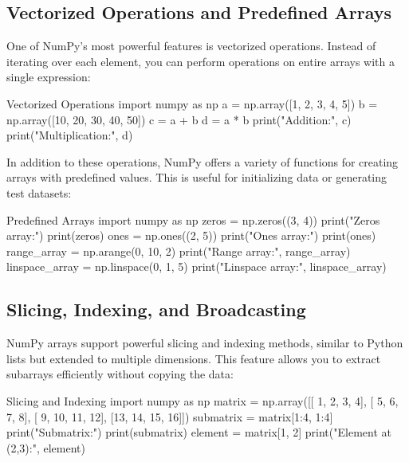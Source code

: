 %
\subsection{Vectorized Operations and Predefined Arrays}

One of NumPy’s most powerful features is vectorized operations. Instead of iterating over each element, you can perform operations on entire arrays with a single expression:

\begin{codeonly}{Vectorized Operations}
import numpy as np
a = np.array([1, 2, 3, 4, 5])
b = np.array([10, 20, 30, 40, 50])
c = a + b
d = a * b
print("Addition:", c)
print("Multiplication:", d)
\end{codeonly}

In addition to these operations, NumPy offers a variety of functions for creating arrays with predefined values. This is useful for initializing data or generating test datasets:

\begin{codeonly}{Predefined Arrays}
import numpy as np
zeros = np.zeros((3, 4))
print("Zeros array:")
print(zeros)
ones = np.ones((2, 5))
print("Ones array:")
print(ones)
range_array = np.arange(0, 10, 2)
print("Range array:", range_array)
linspace_array = np.linspace(0, 1, 5)
print("Linspace array:", linspace_array)
\end{codeonly}

%
\subsection{Slicing, Indexing, and Broadcasting}

NumPy arrays support powerful slicing and indexing methods, similar to Python lists but extended to multiple dimensions. This feature allows you to extract subarrays efficiently without copying the data:

\begin{codeonly}{Slicing and Indexing}
import numpy as np
matrix = np.array([[ 1,  2,  3,  4],
                   [ 5,  6,  7,  8],
                   [ 9, 10, 11, 12],
                   [13, 14, 15, 16]])
submatrix = matrix[1:4, 1:4]
print("Submatrix:")
print(submatrix)
element = matrix[1, 2]
print("Element at (2,3):", element)
\end{codeonly}

